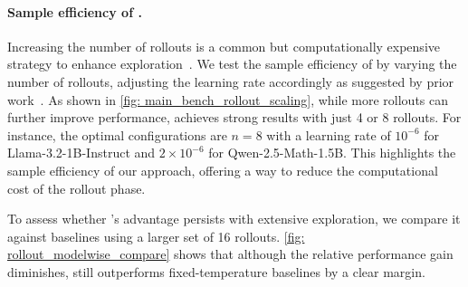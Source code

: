 %




\paragraph{Sample efficiency of \alg.}
Increasing the number of rollouts is a common but computationally expensive strategy to enhance exploration~\citep{hou2025t1}. 
%
We test the sample efficiency of \alg by varying the number of rollouts, adjusting the learning rate accordingly as suggested by prior work~\citep{chen2025pass}. 
%
As shown in \cref{fig: main_bench_rollout_scaling}, while more rollouts can further improve performance, \alg achieves strong results with just 4 or 8 rollouts. 
%
For instance, the optimal configurations are $n=8$ with a learning rate of $10^{-6}$ for Llama-3.2-1B-Instruct and $2\times10^{-6}$ for Qwen-2.5-Math-1.5B. 
%
This highlights the sample efficiency of our approach, offering a way to reduce the computational cost of the rollout phase.
%

To assess whether \alg's advantage persists with extensive exploration, we compare it against baselines using a larger set of 16 rollouts. 
%
\cref{fig: rollout_modelwise_compare} shows that although the relative performance gain diminishes, \alg still outperforms fixed-temperature baselines by a clear margin.
%





